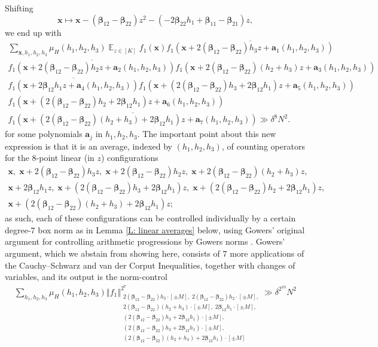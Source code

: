\documentclass[11pt]{amsart}
\theoremstyle{definition}
\DeclareMathOperator*{\E}{\mathbb{E}}
\newcommand{\ba}{{\textbf{a}}}
\newcommand{\bx}{{\textbf{x}}}
\newcommand{\bbeta}{{\boldsymbol{\beta}}}
\newcommand{\norm}[1]{\left\Vert #1\right\Vert}
\begin{document}
Shifting $$\bx\mapsto \bx - (\bbeta_{12}-\bbeta_{22})z^2 - (-2\bbeta_{22}h_1+\bbeta_{11}-\bbeta_{21})z,$$ we end up with
\begin{multline*}
    \sum_{\bx, h_1, h_2, h_3}\mu_H(h_1, h_2, h_3)\E_{z\in[K]}f_1(\bx)
    \overline{f_1(\bx + 2(\bbeta_{12}-\bbeta_{22})h_3 z+\ba_1(h_1, h_2, h_3))}\\
    \overline{f_1(\bx + 2(\bbeta_{12}-\bbeta_{22})h_2 z+\ba_2(h_1, h_2, h_3))}
    {f_1(\bx + 2(\bbeta_{12}-\bbeta_{22})(h_2+h_3)z + \ba_3(h_1, h_2, h_3))}\\
    \overline{f_1(\bx +2\bbeta_{12}h_1z + \ba_4(h_1,h_2, h_3))}
    {f_1(\bx + (2(\bbeta_{12}-\bbeta_{22})h_3 + 2\bbeta_{12}h_1)z + \ba_5(h_1,h_2, h_3))}\\
    {f_1(\bx + (2(\bbeta_{12}-\bbeta_{22})h_2 + 2\bbeta_{12}h_1)z +  \ba_6(h_1,h_2, h_3))}\\
    \overline{f_1(\bx + (2(\bbeta_{12}-\bbeta_{22})(h_2+h_3) + 2\bbeta_{12}h_1) z +  \ba_7(h_1,h_2, h_3))}\gg \delta^8 N^2.
\end{multline*}
for some polynomials $\ba_j$ in $h_1, h_2, h_3$. The important point about this new expression is that it is an average, indexed by $(h_1, h_2, h_3)$, of counting operators for the $8$-point linear (in $z$) configurations
\begin{gather*}
    \bx,\; \bx + 2(\bbeta_{12}-\bbeta_{22})h_3 z,\; \bx + 2(\bbeta_{12}-\bbeta_{22})h_2 z,\; \bx + 2(\bbeta_{12}-\bbeta_{22})(h_2+h_3)z,\\ \bx +2\bbeta_{12}h_1z,\;  \bx + (2(\bbeta_{12}-\bbeta_{22})h_3 + 2\bbeta_{12}h_1)z,\; \bx + (2(\bbeta_{12}-\bbeta_{22})h_2 + 2\bbeta_{12}h_1)z,\\ \bx + (2(\bbeta_{12}-\bbeta_{22})(h_2+h_3) + 2\bbeta_{12}h_1) z;
\end{gather*}
as such, each of these configurations can be controlled individually by a certain degree-$7$ box norm as in Lemma \ref{L: linear averages} below, using Gowers' original argument for controlling arithmetic progressions by Gowers norms \cite{Go98a, Go01}. Gowers' argument, which we abstain from showing here, consists of $7$ more applications of the Cauchy--Schwarz and van der Corput Inequalities, together with changes of variables, and its output is the norm-control
\begin{align*}
     \sum_{h_1, h_2, h_3}\mu_H(h_1, h_2, h_3)\norm{f_1}^{2^7}_{\substack{2(\bbeta_{12}-\bbeta_{22})h_3\cdot[\pm M],\; 2(\bbeta_{12}-\bbeta_{22})h_2\cdot[\pm M],\\ 2(\bbeta_{12}-\bbeta_{22})(h_2+h_3)\cdot[\pm M],\; 2\bbeta_{12}h_1\cdot[\pm M],\\ (2(\bbeta_{12}-\bbeta_{22})h_3 + 2\bbeta_{12}h_1)\cdot[\pm M],\\ (2(\bbeta_{12}-\bbeta_{22})h_2 + 2\bbeta_{12}h_1)\cdot[\pm M],\\  (2(\bbeta_{12}-\bbeta_{22})(h_2+h_3) + 2\bbeta_{12}h_1)\cdot[\pm M]}}\gg \delta^{2^{10}}N^2
\end{align*}
\end{document}
